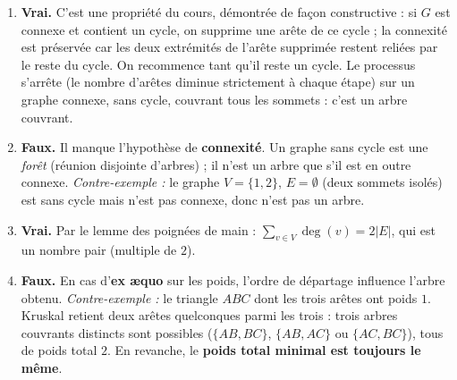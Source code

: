 \documentclass[11pt]{article}
\begin{document}
\begin{corrige}
\begin{enumerate}
\item \textbf{Vrai.} C'est une propriété du cours, démontrée de façon constructive : si $G$ est connexe et contient un cycle, on supprime une arête de ce cycle ; la connexité est préservée car les deux extrémités de l'arête supprimée restent reliées par le reste du cycle. On recommence tant qu'il reste un cycle. Le processus s'arrête (le nombre d'arêtes diminue strictement à chaque étape) sur un graphe connexe, sans cycle, couvrant tous les sommets : c'est un arbre couvrant.
\item \textbf{Faux.} Il manque l'hypothèse de \textbf{connexité}. Un graphe sans cycle est une \emph{forêt} (réunion disjointe d'arbres) ; il n'est un arbre que s'il est en outre connexe. \emph{Contre-exemple :} le graphe $V = \{1, 2\}$, $E = \emptyset$ (deux sommets isolés) est sans cycle mais n'est pas connexe, donc n'est pas un arbre.
\item \textbf{Vrai.} Par le lemme des poignées de main : $\displaystyle\sum_{v \in V} \deg(v) = 2|E|$, qui est un nombre pair (multiple de $2$).
\item \textbf{Faux.} En cas d'\textbf{ex æquo} sur les poids, l'ordre de départage influence l'arbre obtenu. \emph{Contre-exemple :} le triangle $ABC$ dont les trois arêtes ont poids $1$. Kruskal retient deux arêtes quelconques parmi les trois : trois arbres couvrants distincts sont possibles ($\{AB, BC\}$, $\{AB, AC\}$ ou $\{AC, BC\}$), tous de poids total $2$. En revanche, le \textbf{poids total minimal est toujours le même}.
\end{enumerate}
\end{corrige}
\end{document}
